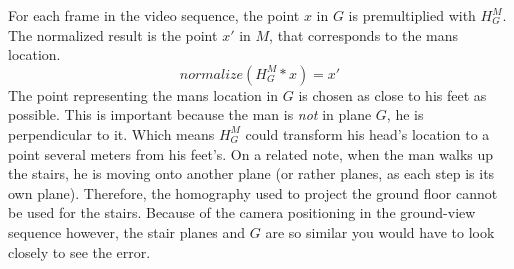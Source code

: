 For each frame in the video sequence, the point $x$ in $G$ is premultiplied
with $H_{G}^{M}$. The normalized result is the point $x'$ in $M$, that
corresponds to the mans location. $$normalize(H_{G}^{M}*x) = x'$$ The point
representing the mans location in $G$ is chosen as close to his feet as possible.
This is important because the man is \emph{not} in plane $G$, he is
perpendicular to it. Which means $H_{G}^{M}$ could transform his head's
location to a point several meters from his feet's.
On a related note, when the man walks up the stairs, he is moving onto another
plane (or rather planes, as each step is its own plane). Therefore, the
homography used to project the ground floor cannot be used for the stairs.
Because of the camera positioning in the ground-view sequence however, the
stair planes and $G$ are so similar you would have to look closely to see the
error.

